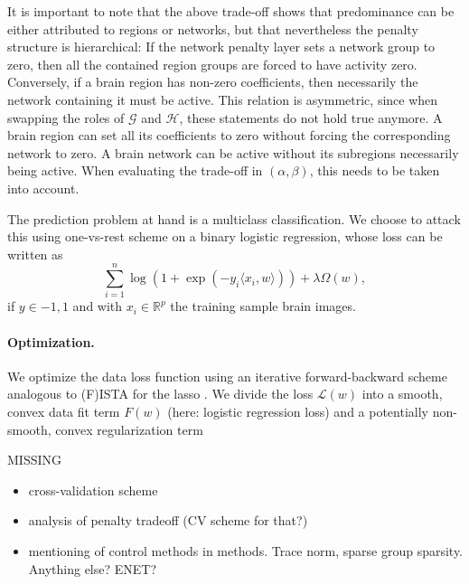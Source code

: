 \documentclass{article} %
\newcommand{\R}{\mathbb{R}}
\begin{document}
It is important to note that the above trade-off shows that predominance
can be either attributed to regions or networks, but that nevertheless the
penalty structure is hierarchical: If the network penalty layer sets a
network group to zero, then all the contained region groups are forced to
have activity zero. Conversely, if a brain region has non-zero coefficients,
then necessarily the network containing it must be active.
This relation is asymmetric, since when swapping the roles of \(\mathcal G\)
 and \(\mathcal H\), these statements do not hold true anymore. A brain 
region can set all its coefficients to zero without forcing the 
corresponding network to zero. A brain network can be active without its
subregions necessarily being active.
When evaluating the trade-off in \((\alpha, \beta)\), this needs to be taken
into account.

The prediction problem at hand is a multiclass classification. We choose to
attack this using one-vs-rest scheme on a binary logistic regression, whose
loss can be written as
\[\sum_{i=1}^n\log(1 + \exp(-y_i\langle x_i, w\rangle)) + \lambda\Omega(w),\]
if \(y\in{-1, 1}\) and with \(x_i\in\R^p\) the training sample brain images.

\paragraph{Optimization.}
We optimize the data loss function using an iterative forward-backward
scheme analogous to (F)ISTA for the lasso \cite{beck2009}. We divide the
loss \(\mathcal L(w)\) into a smooth, convex data fit term \(F(w)\) (here: 
logistic regression loss) and a potentially non-smooth, convex 
regularization term

{\color{red}
MISSING
\begin{itemize}
\item cross-validation scheme
\item analysis of penalty tradeoff (CV scheme for that?)
\item mentioning of control methods in methods. Trace norm, sparse group sparsity. Anything else? ENET?
\end{itemize}
}
\end{document}
